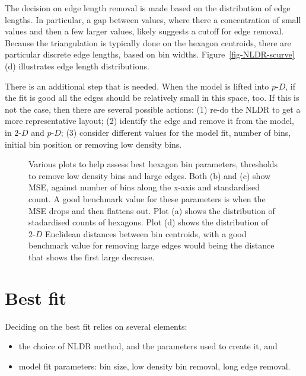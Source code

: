 \documentclass[
  12pt]{article}
\providecommand{\tightlist}{%
  \setlength{\itemsep}{0pt}\setlength{\parskip}{0pt}}\usepackage{longtable,booktabs,array}
\def\tightlist{}
\newcommand\pD{$p\text{-}D$}
\newcommand\gD{$2\text{-}D$}
\begin{document}
The decision on edge length removal is made based on the distribution of
edge lengths. In particular, a gap between values, where there a
concentration of small values and then a few larger values, likely
suggests a cutoff for edge removal. Because the triangulation is
typically done on the hexagon centroids, there are particular discrete
edge lengths, based on bin widths. Figure~\ref{fig-NLDR-scurve} (d)
illustrates edge length distributions.

There is an additional step that is needed. When the model is lifted
into \pD{}, if the fit is good all the edges should be relatively small
in this space, too. If this is not the case, then there are several
possible actions: (1) re-do the NLDR to get a more representative
layout; (2) identify the edge and remove it from the model, in \gD{} and
\pD{}; (3) consider different values for the model fit, number of bins,
initial bin position or removing low density bins.

\begin{figure}[H]


\caption{\label{fig-param-scurve}Various plots to help assess best
hexagon bin parameters, thresholds to remove low density bins and large
edges. Both (b) and (c) show MSE, against number of bins along the
x-axis and standardised count. A good benchmark value for these
parameters is when the MSE drops and then flattens out. Plot (a) shows
the distribution of stadardised counts of hexagons. Plot (d) shows the
distribution of \(2\text{-}D\) Euclidean distances between bin
centroids, with a good benchmark value for removing large edges would
being the distance that shows the first large decrease.}

\end{figure}%

\section{Best fit}\label{best-fit}

Deciding on the best fit relies on several elements:

\begin{itemize}
\tightlist
\item
  the choice of NLDR method, and the parameters used to create it, and
\item
  model fit parameters: bin size, low density bin removal, long edge
  removal.
\end{itemize}
\end{document}
